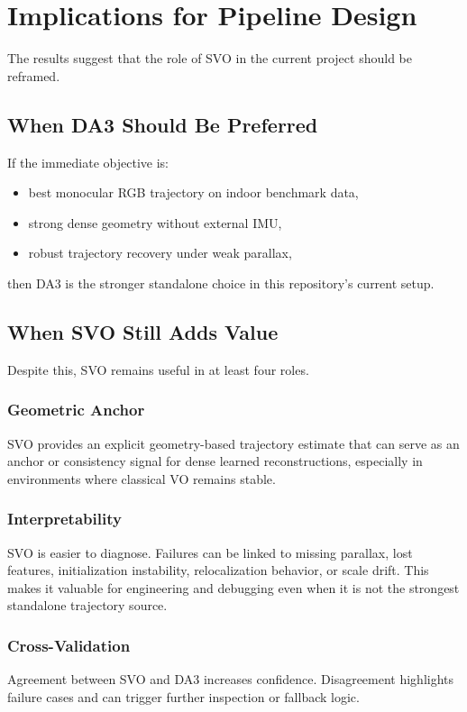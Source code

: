 \documentclass[conference]{IEEEtran}
\begin{document}
\section{Implications for Pipeline Design}
The results suggest that the role of SVO in the current project should be reframed.

\subsection{When DA3 Should Be Preferred}
If the immediate objective is:
\begin{itemize}
\item best monocular RGB trajectory on indoor benchmark data,
\item strong dense geometry without external IMU,
\item robust trajectory recovery under weak parallax,
\end{itemize}
then DA3 is the stronger standalone choice in this repository's current setup.

\subsection{When SVO Still Adds Value}
Despite this, SVO remains useful in at least four roles.

\subsubsection{Geometric Anchor}
SVO provides an explicit geometry-based trajectory estimate that can serve as an anchor or consistency signal for dense learned reconstructions, especially in environments where classical VO remains stable.

\subsubsection{Interpretability}
SVO is easier to diagnose. Failures can be linked to missing parallax, lost features, initialization instability, relocalization behavior, or scale drift. This makes it valuable for engineering and debugging even when it is not the strongest standalone trajectory source.

\subsubsection{Cross-Validation}
Agreement between SVO and DA3 increases confidence. Disagreement highlights failure cases and can trigger further inspection or fallback logic.
\end{document}

